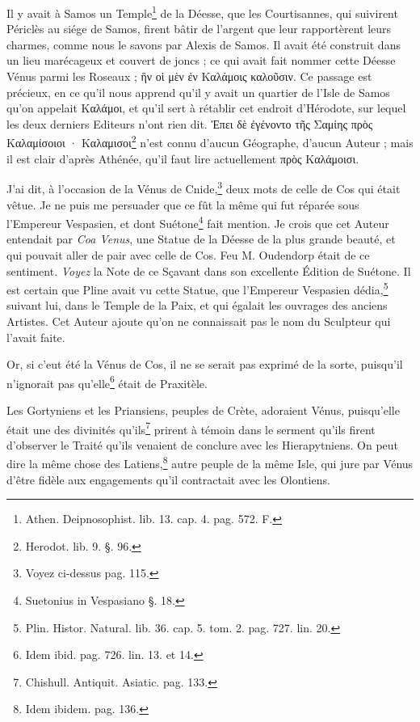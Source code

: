\documentclass[a4paper, 11pt, oneside, polutonikogreek, french]{article}
\begin{document}
Il y avait à Samos un Temple\footnote{Athen. Deipnosophist. lib. 13. cap. 4. pag. 572. F.} de la Déesse, que les Courtisannes, qui suivirent Périclès au siége de Samos, firent bâtir de l'argent que leur rapportèrent leurs charmes, comme nous le savons par Alexis de Samos. Il avait été construit dans un lieu marécageux et couvert de joncs ; ce qui avait fait nommer cette Déesse Vénus parmi les Roseaux ; ἣν οἱ μὲν ἐν Καλάμοις καλοῦσιν. Ce passage est précieux, en ce qu'il nous apprend qu'il y avait un quartier de l'Isle de Samos qu'on appelait Καλάμοι, et qu'il sert à rétablir cet endroit d'Hérodote, sur lequel les deux derniers Editeurs n'ont rien dit. Ἐπει δὲ ἐγένοντο τῆς Σαμίης πρὸς Καλαμίσοιοι · Καλαμισοι\footnote{Herodot. lib. 9. §. 96.} n'est connu d'aucun Géographe, d'aucun Auteur ; mais il est clair d'après Athénée, qu'il faut lire actuellement πρὸς Καλάμοισι.

J'ai dit, à l'occasion de la Vénus de Cnide,\footnote{Voyez ci-dessus pag. 115.} deux mots de celle de Cos qui était vêtue. Je ne puis me persuader que ce fût la même qui fut réparée sous l'Empereur Vespasien, et dont Suétone\footnote{Suetonius in Vespasiano §. 18.} fait mention. Je crois que cet Auteur entendait par \emph{Coa Venus}, une Statue de la Déesse de la plus grande beauté, et qui pouvait aller de pair avec celle de Cos. Feu M. Oudendorp était de ce sentiment. \emph{Voyez} la Note de ce Sçavant dans son excellente Édition de Suétone. Il est certain que Pline avait vu cette Statue, que l'Empereur Vespasien dédia,\footnote{Plin. Histor. Natural. lib. 36. cap. 5. tom. 2. pag. 727. lin. 20.} suivant lui, dans le Temple de la Paix, et qui égalait les ouvrages des anciens Artistes. Cet Auteur ajoute qu'on ne connaissait pas le nom du Sculpteur qui l'avait faite.

Or, si c'eut été la Vénus de Cos, il ne se serait pas exprimé de la sorte, puisqu'il n'ignorait pas qu'elle\footnote{Idem ibid. pag. 726. lin. 13. et 14.} était de Praxitèle.

Les Gortyniens et les Priansiens, peuples de Crète, adoraient Vénus, puisqu'elle était une des divinités qu'ils\footnote{Chishull. Antiquit. Asiatic. pag. 133.} prirent à témoin dans le serment qu'ils firent d'observer le Traité qu'ils venaient de conclure avec les Hierapytniens. On peut dire la même chose des Latiens,\footnote{Idem ibidem. pag. 136.} autre peuple de la même Isle, qui jure par Vénus d'être fidèle aux engagements qu'il contractait avec les Olontiens.
\end{document}
